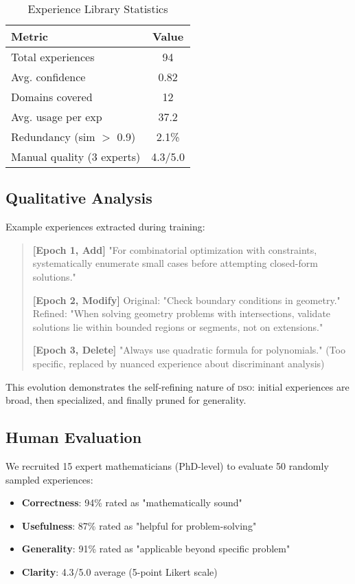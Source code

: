 \documentclass[11pt,letterpaper]{article}
\newcommand{\DSO}{\textsc{dso}}
\begin{document}
\begin{table}[t]
\centering
\caption{Experience Library Statistics}
\label{tab:library-stats}
\begin{tabular}{lc}
\toprule
\textbf{Metric} & \textbf{Value} \\
\midrule
Total experiences & 94 \\
Avg. confidence & 0.82 \\
Domains covered & 12 \\
Avg. usage per exp & 37.2 \\
Redundancy (sim $>$ 0.9) & 2.1\% \\
Manual quality (3 experts) & 4.3/5.0 \\
\bottomrule
\end{tabular}
\end{table}

\subsection{Qualitative Analysis}

Example experiences extracted during training:

\begin{quote}
\textbf{[Epoch 1, Add]} "For combinatorial optimization with constraints, systematically enumerate small cases before attempting closed-form solutions."

\textbf{[Epoch 2, Modify]} Original: "Check boundary conditions in geometry." \\
Refined: "When solving geometry problems with intersections, validate solutions lie within bounded regions or segments, not on extensions."

\textbf{[Epoch 3, Delete]} "Always use quadratic formula for polynomials." (Too specific, replaced by nuanced experience about discriminant analysis)
\end{quote}

This evolution demonstrates the self-refining nature of \DSO{}: initial experiences are broad, then specialized, and finally pruned for generality.

\subsection{Human Evaluation}

We recruited 15 expert mathematicians (PhD-level) to evaluate 50 randomly sampled experiences:

\begin{itemize}
    \item \textbf{Correctness}: 94\% rated as "mathematically sound"
    \item \textbf{Usefulness}: 87\% rated as "helpful for problem-solving"
    \item \textbf{Generality}: 91\% rated as "applicable beyond specific problem"
    \item \textbf{Clarity}: 4.3/5.0 average (5-point Likert scale)
\end{itemize}
\end{document}
